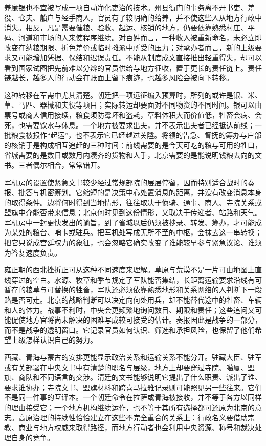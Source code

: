 养廉银也不宜被写成一项自动净化吏治的技术。州县衙门的事务离不开书吏、差役、仓夫、船户与经手商人，官员有了较明确的给养，并不使这些人从地方行政中消失。相反，凡是需要催粮、验收、起运、核销的地方，仍要依靠熟悉村庄、平码、河道和市场的人来使程序继续。对百姓而言，一种收入被重新命名，未必立即改变在纳粮期限、折色差价或临时摊派中所受的压力；对承办者而言，新的上级要求又可能增加凭据、保结和迟误责任。不能从制度成文直接推出轻重得失，却可以看到国家试图把先前难以分辨的官员供给与地方征收，置于更长的责任链上。责任链越长，越多人的行动会在账面上留下痕迹，也越多风险会被向下转移。

这种转移在军需中尤其清楚。朝廷把一项远征编入预算时，所列的或许是银、米、草、马匹、器械和夫役等项目；实际转运却要面对不同物资的不同时间。银可以由票号或商人信用接续，粮食须防霉坏和盗耗，草料体积大而价值低，牲畜会病、会死，也需要饮水与休息。一个地方被要求出夫，并不表示出夫者已经抵达前线；一批粮食被报作“起运”，也不表示它已经越过关隘。将领的告急、督抚的筹办与户部的核销于是构成相互追赶的三种时间：前线需要的是今天可吃的粮与可用的牲口，省城需要的是数日或数月内凑齐的货物和人手，北京需要的是能说明钱粮去向的文书。三者偶尔相合，常常错开。

军机房的设置使紧急文书较少经过常规部院的层层停留，因而特别适合战时的奏报、批答与机密筹划。它缩短的是决策中心处置消息的距离，并没有改变消息本身的取得条件。边将何时得到当地情形，往往取决于侦骑、通事、商人、寺院关系或盟旗中介能否带来信息；北京何时见到这份情形，又取决于传递者、站路和天气。军机房中一封更快发出的谕旨，到了省城以后仍须被抄录、转发、筹办，才可能成为某处的粮台、哨卡或驻兵。把军机处写成无所不至的中枢，会抹去这一串转换；把它只说成宫廷权力的象征，也会忽略它确实改变了谁能较早参与紧急议论、谁须为答复速度负责。

雍正朝的西北挫折正可从这种不同速度来理解。草原与荒漠不是一片可由地图上直线穿过的空白。水源、牧草和季节规定了军队能否集结，长距离运输要求沿线有可暂存的粮草与可替换的牲畜，军队还必须依靠熟悉地形和关系网络的人判断下一段路是否可走。北京的战略判断可以决定向何处用兵，却不能替代途中的牲畜、车辆和人的体力。战事不利时，中央会更频繁地询问数目、期限和责任；这些追问又可能促使地方官将尚未解决的困难写成较可接受的估计。奏报因此是战争的一部分，而不是战争的透明窗口。它记录官员如何认识、筛选和承担风险，也保留了他们希望上级怎样认识自己的努力。

西藏、青海与蒙古的安排更能显示政治关系和运输关系不能分开。驻藏大臣、驻军或有关部署在中央文书中有清楚的职名与层级，地方上却要穿过寺院、噶厦、盟旗、商队和不同语言的交涉。清廷的文书能够说明它提出了什么职责、派出了谁、要求谁协办；寺院文书、盟旗材料和跨喜马拉雅记录则可能照见另一些往来。它们不是同一件事的互译本。一个朝廷命令在拉萨或青海被接收，并不等于各方以同样的理由接受它；一个地方机构继续运作，也不等于其所有选择都可还原为北京的意志。高原治理的持续性恰恰建立在这些不完全重合的关系上：行政名义要借助宗教、商业与地方权威来取得路径，而地方行动者也会利用中央资源、称号和裁决处理自身的竞争。

